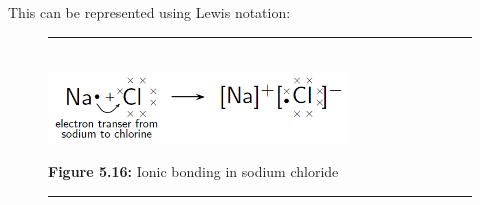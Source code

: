         
        \label{m38684*id142337}This can be represented using Lewis notation:\par 
        
    \setcounter{subfigure}{0}


	\begin{figure}[H] %
    \begin{center}
    \rule[.1in]{\figurerulewidth}{.005in} \\
        \label{m38684*uid55!!!underscore!!!media}\label{m38684*uid55!!!underscore!!!printimage}\includegraphics[width=300px]{col11305.imgs/m38684_CG11C1_019.png} %
        
      \vspace{2pt}
    \vspace{\rubberspace}\par \begin{cnxcaption}
	  \small \textbf{Figure 5.16: }Ionic bonding in sodium chloride
	\end{cnxcaption}
      
    \vspace{.1in}
    \rule[.1in]{\figurerulewidth}{.005in} \\
        
    \end{center}

 \end{figure}   

    \addtocounter{footnote}{-0}
    
